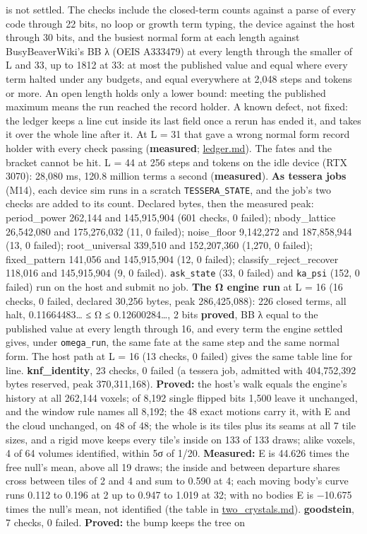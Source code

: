 \begin{description}
is not settled. The checks include the closed-term counts against a parse of every code through 22 bits, no loop or growth term typing, the device against the host through 30 bits, and the busiest normal form at each length against BusyBeaverWiki's BB λ (OEIS A333479) at every length through the smaller of L and 33, up to 1812 at 33: at most the published value and equal where every term halted under any budgets, and equal everywhere at 2,048 steps and tokens or more. An open length holds only a lower bound: meeting the published maximum means the run reached the record holder. A known defect, not fixed: the ledger keeps a line cut inside its last field once a rerun has ended it, and takes it over the whole line after it. At L = 31 that gave a wrong normal form record holder with every check passing (\textbf{measured}; \hyperref[chap:ledger]{ledger.md}). The fates and the bracket cannot be hit. L = 44 at 256 steps and tokens on the idle device (RTX 3070): 28,080 ms, 120.8 million terms a second (\textbf{measured}). \textbf{As tessera jobs} (M14), each device sim runs in a scratch \texttt{TESSERA\_\allowbreak{}STATE}, and the job's two checks are added to its count. Declared bytes, then the measured peak: period\_\allowbreak{}power 262,144 and 145,915,904 (601 checks, 0 failed); nbody\_\allowbreak{}lattice 26,542,080 and 175,276,032 (11, 0 failed); noise\_\allowbreak{}floor 9,142,272 and 187,858,944 (13, 0 failed); root\_\allowbreak{}universal 339,510 and 152,207,360 (1,270, 0 failed); fixed\_\allowbreak{}pattern 141,056 and 145,915,904 (12, 0 failed); classify\_\allowbreak{}reject\_\allowbreak{}recover 118,016 and 145,915,904 (9, 0 failed). \texttt{ask\_\allowbreak{}state} (33, 0 failed) and \texttt{ka\_\allowbreak{}psi} (152, 0 failed) run on the host and submit no job. \textbf{The Ω engine run} at L = 16 (16 checks, 0 failed, declared 30,256 bytes, peak 286,425,088): 226 closed terms, all halt, 0.11664483… ≤ Ω ≤ 0.12600284…, 2 bits \textbf{proved}, BB λ equal to the published value at every length through 16, and every term the engine settled gives, under \texttt{omega\_\allowbreak{}run}, the same fate at the same step and the same normal form. The host path at L = 16 (13 checks, 0 failed) gives the same table line for line. \textbf{knf\_\allowbreak{}identity}, 23 checks, 0 failed (a tessera job, admitted with 404,752,392 bytes reserved, peak 370,311,168). \textbf{Proved:} the host's walk equals the engine's history at all 262,144 voxels; of 8,192 single flipped bits 1,500 leave it unchanged, and the window rule names all 8,192; the 48 exact motions carry it, with E and the cloud unchanged, on 48 of 48; the whole is its tiles plus its seams at all 7 tile sizes, and a rigid move keeps every tile's inside on 133 of 133 draws; alike voxels, 4 of 64 volumes identified, within 5σ of 1/20. \textbf{Measured:} E is 44.626 times the free null's mean, above all 19 draws; the inside and between departure shares cross between tiles of 2 and 4 and sum to 0.590 at 4; each moving body's curve runs 0.112 to 0.196 at 2 up to 0.947 to 1.019 at 32; with no bodies E is −10.675 times the null's mean, not identified (the table in \hyperref[chap:two-crystals]{two\_\allowbreak{}crystals.md}). \textbf{goodstein}, 7 checks, 0 failed. \textbf{Proved:} the bump keeps the tree on 
\end{description}
